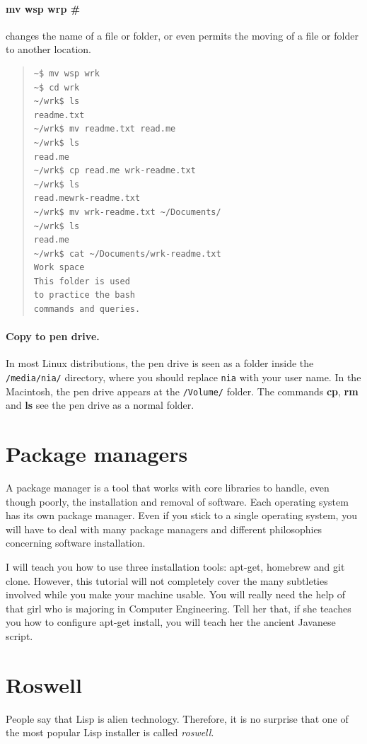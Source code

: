 \documentclass[a4paper,12pt]{book}
\begin{document}
\paragraph{mv wsp wrp \#} changes
the name of a file or folder, or
even permits the moving of a file or
folder to another location.
\begin{quote}
\begin{verbatim}
~$ mv wsp wrk
~$ cd wrk
~/wrk$ ls
readme.txt
~/wrk$ mv readme.txt read.me
~/wrk$ ls
read.me
~/wrk$ cp read.me wrk-readme.txt
~/wrk$ ls
read.mewrk-readme.txt
~/wrk$ mv wrk-readme.txt ~/Documents/
~/wrk$ ls
read.me
~/wrk$ cat ~/Documents/wrk-readme.txt
Work space
This folder is used
to practice the bash
commands and queries.
\end{verbatim}
\end{quote}

\paragraph{Copy to pen drive.}
In most Linux distributions, the pen drive is
seen as a folder inside the \verb|/media/nia/|
directory, where you should replace \verb|nia|
with your user name. In the Macintosh, the
pen drive appears at the \verb|/Volume/| folder.
The commands {\bf cp}, {\bf rm} and {\bf ls}
see the pen drive as a normal folder.


\section{Package managers}
A package
manager is a tool that works with
core libraries to handle, even though poorly,
the installation and removal of
software. Each operating system has its own
package manager. Even if you stick to a single
operating system, you will have to
deal with many package managers
and different philosophies concerning
software installation.


I will teach you how to use three
installation tools: apt-get,
homebrew and git clone. However,
this tutorial will not
completely cover the many subtleties
involved while you make your machine usable.
You will really need the help of
that girl who is majoring in
Computer Engineering.
Tell her that, if she teaches you
how to configure apt-get install,
you will teach her the ancient
Javanese script.

\section{Roswell}
People say that Lisp is alien technology.
Therefore, it is no surprise that one of
the most popular Lisp installer is called
{\em roswell}. 
\end{document}
